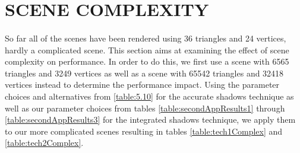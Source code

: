 \section{SCENE COMPLEXITY}
\paragraph{}
So far all of the scenes have been rendered using 36 triangles and 24 vertices, hardly a complicated scene.  This section aims at examining the effect of scene complexity on performance.  In order to do this, we first use a scene with 6565 triangles and 3249 vertices as well as a scene with 65542 triangles and 32418 vertices instead to determine the performance impact.  Using the parameter choices and alternatives from \ref{table:5.10} for the accurate shadows technique as well as our parameter choices from tables \ref{table:secondAppResults1} through \ref{table:secondAppResults3} for the integrated shadows technique, we apply them to our more complicated scenes resulting in tables \ref{table:tech1Complex} and \ref{table:tech2Complex}.

